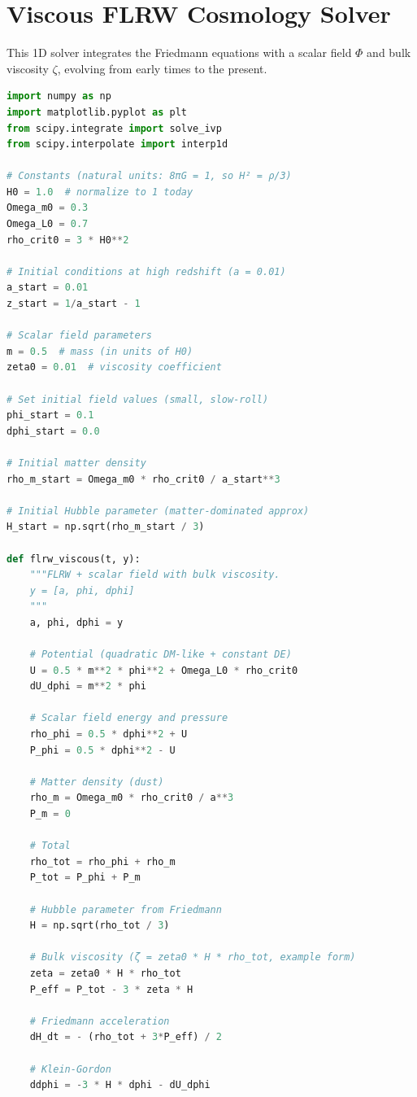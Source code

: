 \documentclass[12pt,a4paper]{book}
\begin{document}
\section{Viscous FLRW Cosmology Solver}

This 1D solver integrates the Friedmann equations with a scalar field $\Phi$ and bulk viscosity $\zeta$, evolving from early times to the present.

\begin{lstlisting}[language=Python, caption=Viscous FLRW Cosmology]
import numpy as np
import matplotlib.pyplot as plt
from scipy.integrate import solve_ivp
from scipy.interpolate import interp1d

# Constants (natural units: 8πG = 1, so H² = ρ/3)
H0 = 1.0  # normalize to 1 today
Omega_m0 = 0.3
Omega_L0 = 0.7
rho_crit0 = 3 * H0**2

# Initial conditions at high redshift (a = 0.01)
a_start = 0.01
z_start = 1/a_start - 1

# Scalar field parameters
m = 0.5  # mass (in units of H0)
zeta0 = 0.01  # viscosity coefficient

# Set initial field values (small, slow-roll)
phi_start = 0.1
dphi_start = 0.0

# Initial matter density
rho_m_start = Omega_m0 * rho_crit0 / a_start**3

# Initial Hubble parameter (matter-dominated approx)
H_start = np.sqrt(rho_m_start / 3)

def flrw_viscous(t, y):
    """FLRW + scalar field with bulk viscosity.
    y = [a, phi, dphi]
    """
    a, phi, dphi = y

    # Potential (quadratic DM-like + constant DE)
    U = 0.5 * m**2 * phi**2 + Omega_L0 * rho_crit0
    dU_dphi = m**2 * phi

    # Scalar field energy and pressure
    rho_phi = 0.5 * dphi**2 + U
    P_phi = 0.5 * dphi**2 - U

    # Matter density (dust)
    rho_m = Omega_m0 * rho_crit0 / a**3
    P_m = 0

    # Total
    rho_tot = rho_phi + rho_m
    P_tot = P_phi + P_m

    # Hubble parameter from Friedmann
    H = np.sqrt(rho_tot / 3)

    # Bulk viscosity (ζ = zeta0 * H * rho_tot, example form)
    zeta = zeta0 * H * rho_tot
    P_eff = P_tot - 3 * zeta * H

    # Friedmann acceleration
    dH_dt = - (rho_tot + 3*P_eff) / 2

    # Klein-Gordon
    ddphi = -3 * H * dphi - dU_dphi


\end{lstlisting}
\end{document}
